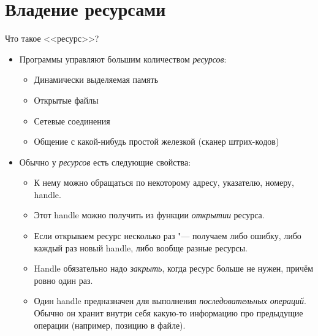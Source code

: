 \section{Владение ресурсами}

\begin{frame}
	\tableofcontents[currentsection]
\end{frame}

\begin{frame}[t]{Что такое <<ресурс>>?}
	\begin{itemize}
		\item Программы управляют большим количеством \textit{ресурсов}:
			\begin{itemize}
				\item Динамически выделяемая память
				\item Открытые файлы
				\item Сетевые соединения
				\item Общение с какой-нибудь простой железкой (сканер штрих-кодов)
			\end{itemize}
		\item Обычно у \textit{ресурсов} есть следующие свойства:
			\begin{itemize}
				\item К нему можно обращаться по некоторому адресу, указателю, номеру, handle.
				\item
					Этот handle можно получить из функции \textit{открытии} ресурса.
				\item
					Если открываем ресурс несколько раз "--- получаем либо ошибку,
					либо каждый раз новый handle, либо вообще разные ресурсы.
				\item
					Handle обязательно надо \textit{закрыть}, когда ресурс больше не нужен, причём ровно один раз.
				\item
					Один handle предназначен для выполнения \textit{последовательных операций}.
					Обычно он хранит внутри себя какую-то информацию про предыдущие операции
					(например, позицию в файле).
			\end{itemize}
	\end{itemize}
\end{frame}

